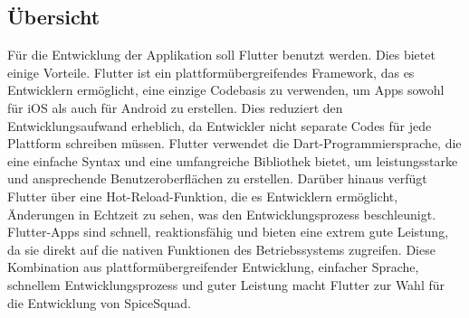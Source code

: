 \documentclass[parskip=full]{scrartcl}
\begin{document}
\subsection{Übersicht}
Für die Entwicklung der Applikation soll Flutter benutzt werden. Dies bietet einige Vorteile. Flutter ist ein plattformübergreifendes Framework, das es Entwicklern ermöglicht, eine einzige Codebasis zu verwenden, um Apps sowohl für iOS als auch für Android zu erstellen. Dies reduziert den Entwicklungsaufwand erheblich, da Entwickler nicht separate Codes für jede Plattform schreiben müssen. Flutter verwendet die Dart-Programmiersprache, die eine einfache Syntax und eine umfangreiche Bibliothek bietet, um leistungsstarke und ansprechende Benutzeroberflächen zu erstellen. Darüber hinaus verfügt Flutter über eine Hot-Reload-Funktion, die es Entwicklern ermöglicht, Änderungen in Echtzeit zu sehen, was den Entwicklungsprozess beschleunigt. Flutter-Apps sind schnell, reaktionsfähig und bieten eine extrem gute Leistung, da sie direkt auf die nativen Funktionen des Betriebssystems zugreifen. Diese Kombination aus plattformübergreifender Entwicklung, einfacher Sprache, schnellem Entwicklungsprozess und guter Leistung macht Flutter zur Wahl für die Entwicklung von SpiceSquad.
\end{document}
